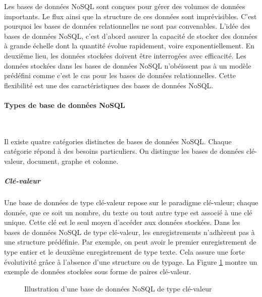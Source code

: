 	Les bases de données NoSQL sont conçues pour gérer des  volumes de données importants. Le flux ainsi que la structure de  ces données sont imprévisibles. C'est pourquoi les bases de données relationnelles ne sont pas convenables. L'idée  des bases de données NoSQL, c'est d'abord assurer la capacité de stocker des données à grande échelle dont la  quantité  évolue rapidement, voire exponentiellement.  En deuxième lieu, les données stockées  doivent être interrogées  avec efficacité. Les données stockées dans  les bases de données NoSQL n'obéissent pas à un modèle prédéfini comme c'est le cas pour les bases de données relationnelles. Cette flexibilité est une des caractéristiques des bases de données NoSQL.
	\paragraph{Types de base de données NoSQL} \label{sec:nosql-database}  ~
	
	Il existe quatre catégories distinctes de bases de données NoSQL. Chaque catégorie répond  à des besoins particuliers. On distingue les bases de données clé-valeur, document, graphe et colonne.
	\subparagraph {Clé-valeur} Une base de données de type clé-valeur repose sur le paradigme clé-valeur; chaque donnée, que ce soit un nombre, du texte ou tout autre type est associé à une clé unique. Cette clé est le seul moyen d'accéder aux données stockées.
	Dans les bases de données NoSQL de type clé-valeur, les enregistrements  n'adhèrent pas à une structure prédéfinie. Par exemple, on peut avoir le premier enregistrement de type entier et le deuxième enregistrement de type texte. Cela assure une forte évolutivité grâce à l'absence d'une structure ou de typage. La Figure \ref{fig:key-value-nosql} montre un exemple de données stockées sous forme de paires clé-valeur.
	\begin{figure}[h]
		\captionsetup{justification=centering}
		\centering
		\resizebox{.4\textwidth}{!}{
			
	    }
		\caption{Illustration d'une base de données NoSQL de type clé-valeur}
		\label{fig:key-value-nosql}
	\end{figure}


